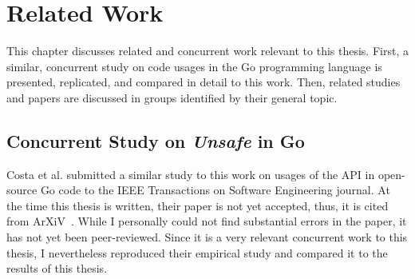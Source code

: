 
\chapter{Related Work}\label{ch:related-work}

This chapter discusses related and concurrent work relevant to this thesis.
First, a similar, concurrent study on \unsafe{} code usages in the Go programming language is presented, replicated, and
compared in detail to this work.
Then, related studies and papers are discussed in groups identified by their general topic.



\section{Concurrent Study on \textit{Unsafe} in Go}\label{sec:related-work:concurrent-study}

Costa et al. submitted a similar study to this work on usages of the \unsafe{} \acrshort{API} in open-source Go code to
the IEEE Transactions on Software Engineering journal.
At the time this thesis is written, their paper is not yet accepted, thus, it is cited from ArXiV~\cite{costa2020}.
While I personally could not find substantial errors in the paper, it has not yet been peer-reviewed.
Since it is a very relevant concurrent work to this thesis, I nevertheless reproduced their empirical study and compared
it to the results of this thesis.

